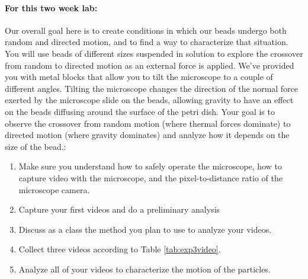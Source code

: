 \paragraph{For this two week lab:} Our overall goal here is to create conditions in which our beads undergo both random and directed motion, and to find a way to characterize that situation. 
You will use beads of different sizes suspended in solution to explore the crossover from random to directed motion as an external force is applied.
We've provided you with metal blocks that allow you to tilt the microscope to a couple of different angles.
Tilting the microscope changes the direction of the normal force exerted by the microscope slide on the beads, allowing gravity to have an effect on the beads diffusing around the surface of the petri dish.
Your goal is to observe the crossover from random motion (where thermal forces dominate) to directed motion (where gravity dominates) and analyze how it depends on the size of the bead.:
\begin{enumerate}
\item Make sure you understand how to safely operate the microscope, how to capture video with the microscope, and the pixel-to-distance ratio of the microscope camera.
\item Capture your first videos and do a preliminary analysis
\item Discuss as a class the method you plan to use to analyze your videos.
\item Collect three videos according to Table \ref{tab:exp3video}.
\item Analyze all of your videos to characterize the motion of the particles.
\end{enumerate}

